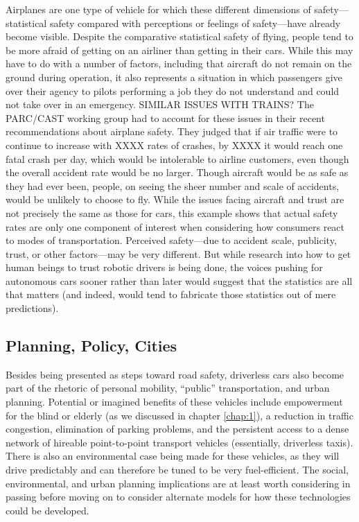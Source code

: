Airplanes are one type of vehicle for which these different dimensions of
safety---statistical safety compared with perceptions or feelings of
safety---have already become visible. Despite the comparative statistical safety of flying,
people tend to be more afraid of getting on an airliner than getting in their
cars.\cite{???} While this may have to do with a number of factors,
including that aircraft do not remain on the ground during operation,
it also represents a situation in which passengers give over their
agency to pilots performing a job they do not understand and could not
take over in an emergency.\cite{???-canIFindAnythingOnThis} SIMILAR
ISSUES WITH TRAINS?\cite{??} The
PARC/CAST working group had to account for these issues in their recent
recommendations about airplane safety. They judged that if air traffic
were to continue to increase with XXXX rates of crashes, by XXXX it
would reach one fatal crash per day, which would be intolerable to
airline customers, even though the overall accident rate would be no
larger.\cite{???-PARCCAST} Though aircraft would be as safe as they
had ever been, people, on seeing the sheer number and scale of
accidents, would be unlikely to choose to fly. While the issues facing
aircraft and trust are not precisely the same as those for cars, this
example shows that actual safety rates are only
one component of interest when considering how consumers react to
modes of transportation. Perceived safety---due to accident scale,
publicity, trust, or other factors---may be very different. But
while research into how to get human beings to trust robotic drivers
is being done\cite{???}, the voices pushing for autonomous cars sooner
rather than later would suggest that the statistics are all that
matters (and indeed, would tend to fabricate those statistics out of
mere predictions). 


\subsection{Planning, Policy, Cities}

Besides being presented as steps toward road safety, driverless cars
also become part of the rhetoric of personal mobility, ``public''
transportation, and urban planning. Potential or imagined
benefits of these vehicles include empowerment for the blind or
elderly (as we discussed in chapter \ref{chap:1}), a reduction in
traffic congestion, elimination of parking problems, and the
persistent access to a dense network of hireable point-to-point
transport vehicles (essentially, driverless taxis). There is
  also an environmental case being made for these vehicles, as they
  will drive predictably and can therefore be tuned to be very
  fuel-efficient. The social, environmental, and urban planning
implications are at least worth considering in passing before moving
on to consider alternate models for how these technologies could be
developed. 

